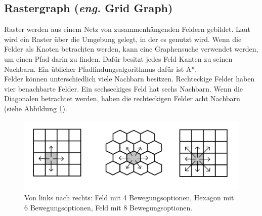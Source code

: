 \subsection{Rastergraph (\textit{eng.} Grid Graph)}
Raster werden aus einem Netz von zusammenhängenden Feldern gebildet.
Laut \cite{Grid:02} wird ein Raster über die Umgebung gelegt, in der es genutzt wird.
Wenn die Felder als Knoten betrachten werden, kann eine Graphensuche verwendet werden, um einen Pfad darin zu finden.
Dafür besitzt jedes Feld Kanten zu seinen Nachbarn. 
Ein üblicher Pfadfindungsalgorithmus dafür ist A*.
\\
Felder können unterschiedlich viele Nachbarn besitzen.
Rechteckige Felder haben vier benachbarte Felder.
Ein sechseckiges Feld hat sechs Nachbarn. Wenn die Diagonalen betrachtet werden, haben die rechteckigen Felder acht Nachbarn (siehe Abbildung \ref{sec2a}).
\begin{figure} %
	\centering
	\includegraphics[width=\textwidth]{images/Grid_Tiles.png}
	\caption{Von links nach rechts: Feld mit 4 Bewegungsoptionen, Hexagon mit 6 Bewegungsoptionen, Feld mit 8 Bewegungsoptionen.}
	\label{sec2a}
\end{figure}



